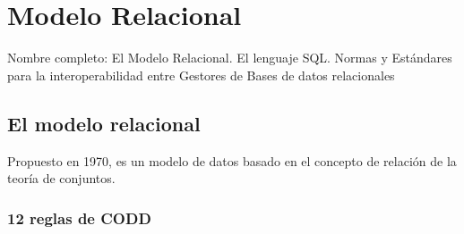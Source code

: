 \setcounter{section}{63} %
\section{Modelo Relacional}

Nombre completo: El Modelo Relacional. El lenguaje SQL. Normas y Estándares para la interoperabilidad entre Gestores de Bases de datos relacionales

\localtableofcontents

\subsection{El modelo relacional}

Propuesto en 1970, es un modelo de datos basado en el concepto de relación de la teoría de conjuntos.
    \subsubsection{12 reglas de CODD}
